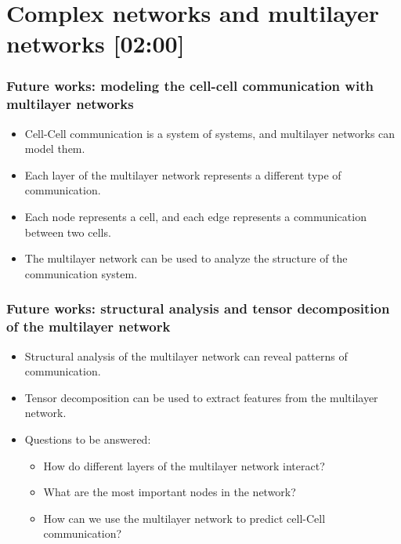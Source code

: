 \section{Complex networks and multilayer networks {[02:00]}}
\begin{frame}
    \frametitle{\scriptsize{Future works: modeling the cell-cell communication with multilayer networks}}
    \begin{block}{}
        \begin{itemize}
            \item Cell-Cell communication is a system of systems, and multilayer networks can model them.
            \item Each layer of the multilayer network represents a different type of communication.
            \item Each node represents a cell, and each edge represents a communication between two cells.
            \item The multilayer network can be used to analyze the structure of the communication system.
        \end{itemize}
    \end{block}
\end{frame}

\begin{frame}
    \frametitle{\scriptsize{Future works: structural analysis and tensor decomposition of the multilayer network}}
    \begin{block}{}
        \begin{itemize}
            \item Structural analysis of the multilayer network can reveal patterns of communication.
            \item Tensor decomposition can be used to extract features from the multilayer network.
            \item Questions to be answered:
                \begin{itemize}
                    \item How do different layers of the multilayer network interact?
                    \item What are the most important nodes in the network?
                    \item How can we use the multilayer network to predict cell-Cell communication?
                \end{itemize}
        \end{itemize}
    \end{block}
\end{frame}

